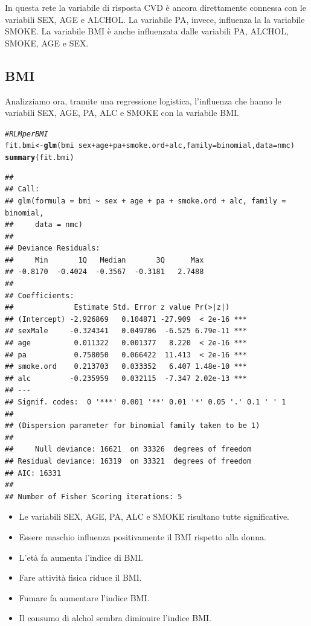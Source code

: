 \documentclass{article}\usepackage[]{graphicx}\usepackage[]{xcolor}
\makeatletter
\newcommand{\hlcom}[1]{\textcolor[rgb]{0.678,0.584,0.686}{\textit{#1}}}%
\newcommand{\hlopt}[1]{\textcolor[rgb]{0,0,0}{#1}}%
\newcommand{\hlstd}[1]{\textcolor[rgb]{0.345,0.345,0.345}{#1}}%
\newcommand{\hlkwb}[1]{\textcolor[rgb]{0.69,0.353,0.396}{#1}}%
\newcommand{\hlkwc}[1]{\textcolor[rgb]{0.333,0.667,0.333}{#1}}%
\newcommand{\hlkwd}[1]{\textcolor[rgb]{0.737,0.353,0.396}{\textbf{#1}}}%
\newenvironment{kframe}{%
 \def\at@end@of@kframe{}%
 \ifinner\ifhmode%
  \def\at@end@of@kframe{\end{minipage}}%
  \begin{minipage}{\columnwidth}%
 \fi\fi%
 \def\FrameCommand##1{\hskip\@totalleftmargin \hskip-\fboxsep
 \colorbox{shadecolor}{##1}\hskip-\fboxsep
     \hskip-\linewidth \hskip-\@totalleftmargin \hskip\columnwidth}%
 \MakeFramed {\advance\hsize-\width
   \@totalleftmargin\z@ \linewidth\hsize
   \@setminipage}}%
 {\par\unskip\endMakeFramed%
 \at@end@of@kframe}
\newenvironment{knitrout}{}{} %
\makeatother
\begin{document}
    In questa rete la variabile di risposta CVD è ancora direttamente connessa 
    con le variabili SEX, AGE e ALCHOL. La variabile PA, invece, influenza la
    la variabile SMOKE. La variabile BMI è anche influenzata dalle variabili 
    PA, ALCHOL, SMOKE, AGE e SEX.
  
  \subsection{BMI}
    Analizziamo ora, tramite una regressione logistica, l'influenza che hanno le
    variabili SEX, AGE, PA, ALC e SMOKE con la variabile BMI.
    
\begin{knitrout}
\color{fgcolor}\begin{kframe}
\begin{alltt}
\hlcom{#RLM per BMI}
\hlstd{fit.bmi} \hlkwb{<-} \hlkwd{glm}\hlstd{(bmi}\hlopt{~}\hlstd{sex}\hlopt{+}\hlstd{age}\hlopt{+}\hlstd{pa}\hlopt{+}\hlstd{smoke.ord}\hlopt{+}\hlstd{alc,} \hlkwc{family}\hlstd{=binomial,} \hlkwc{data}\hlstd{=nmc)}
\hlkwd{summary}\hlstd{(fit.bmi)}
\end{alltt}
\begin{verbatim}
## 
## Call:
## glm(formula = bmi ~ sex + age + pa + smoke.ord + alc, family = binomial, 
##     data = nmc)
## 
## Deviance Residuals: 
##     Min       1Q   Median       3Q      Max  
## -0.8170  -0.4024  -0.3567  -0.3181   2.7488  
## 
## Coefficients:
##              Estimate Std. Error z value Pr(>|z|)    
## (Intercept) -2.926869   0.104871 -27.909  < 2e-16 ***
## sexMale     -0.324341   0.049706  -6.525 6.79e-11 ***
## age          0.011322   0.001377   8.220  < 2e-16 ***
## pa           0.758050   0.066422  11.413  < 2e-16 ***
## smoke.ord    0.213703   0.033352   6.407 1.48e-10 ***
## alc         -0.235959   0.032115  -7.347 2.02e-13 ***
## ---
## Signif. codes:  0 '***' 0.001 '**' 0.01 '*' 0.05 '.' 0.1 ' ' 1
## 
## (Dispersion parameter for binomial family taken to be 1)
## 
##     Null deviance: 16621  on 33326  degrees of freedom
## Residual deviance: 16319  on 33321  degrees of freedom
## AIC: 16331
## 
## Number of Fisher Scoring iterations: 5
\end{verbatim}
\end{kframe}
\end{knitrout}
    
    \begin{itemize}
      \item Le variabili SEX, AGE, PA, ALC e SMOKE risultano tutte significative.
      \item Essere maschio influenza positivamente il BMI rispetto alla donna.
      \item L'età fa aumenta l'indice di BMI.
      \item Fare attività fisica riduce il BMI.
      \item Fumare fa aumentare l'indice BMI.
      \item Il consumo di alchol sembra diminuire l'indice BMI.
    \end{itemize}
    
\end{document}
